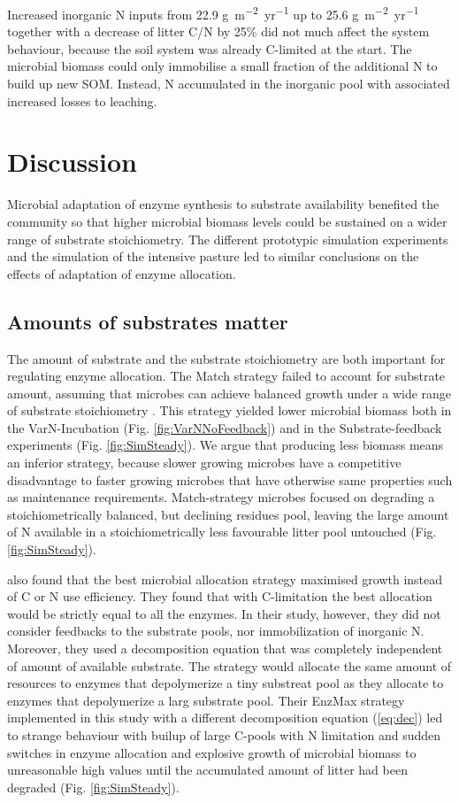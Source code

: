 Increased inorganic N inputs from 22.9 \unit{g~m^{-2}yr^{-1}} up to 25.6
\unit{g~m^{-2}yr^{-1}} together with a decrease of litter C/N by 25\% did not
much affect the system behaviour, because the soil system was already C-limited
at the start. The microbial biomass could only immobilise a small fraction of the additional N to build 
up new SOM. Instead, N accumulated in the inorganic pool with associated
increased losses to leaching.


\section{Discussion}
Microbial adaptation of enzyme synthesis to substrate availability benefited the
community so that higher microbial biomass levels could be sustained on a wider
range of substrate stoichiometry.
The different prototypic simulation experiments and the simulation of the
intensive pasture led to similar conclusions on the effects of adaptation of
enzyme allocation.

\subsection{Amounts of substrates matter}
The amount of substrate and the substrate stoichiometry are both important for
regulating enzyme allocation. The Match strategy failed to account for substrate
amount, assuming that microbes can achieve balanced growth under a wide range of
substrate stoichiometry \citep{Moorhead12, Ballantyne14}. This strategy yielded
lower microbial biomass both in the VarN-Incubation (Fig.
\ref{fig:VarNNoFeedback}) and in the Substrate-feedback experiments (Fig.
\ref{fig:SimSteady}). We argue that producing less biomass means an inferior
strategy, because slower growing microbes have a competitive disadvantage to
faster growing microbes that have otherwise same properties such as
maintenance requirements. Match-strategy microbes focused on degrading a
stoichiometrically balanced, but declining residues pool, leaving the large
amount of N available in a stoichiometrically less favourable litter pool
untouched (Fig. \ref{fig:SimSteady}).

\citet{Averill14} also found that the best microbial allocation strategy
maximised growth instead of C or N use efficiency. They found that with
C-limitation the best allocation would be strictly equal to all the enzymes.
In their study, however, they did not consider feedbacks to the substrate pools,
nor immobilization of inorganic N. Moreover, they used a decomposition equation
that was completely independent of amount of available substrate. The strategy
would allocate the same amount of resources to enzymes that depolymerize a tiny
substreat pool as they allocate to enzymes that depolymerize a larg substrate
pool.
Their EnzMax strategy implemented in this study with a different decomposition
equation (\ref{eq:dec}) led to strange behaviour with builup of large C-pools
with N limitation and sudden switches in enzyme allocation and explosive growth
of microbial biomass to unreasonable high values until the accumulated amount of
litter had been degraded (Fig. \ref{fig:SimSteady}).

